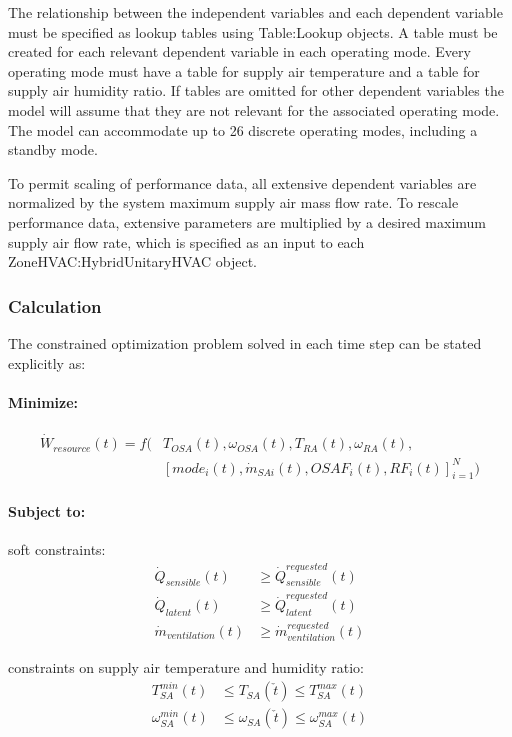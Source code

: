 The relationship between the independent variables and each dependent variable must be specified as lookup tables using Table:Lookup objects. A table must be created for each relevant dependent variable in each operating mode. Every operating mode must have a table for supply air temperature and a table for supply air humidity ratio. If tables are omitted for other dependent variables the model will assume that they are not relevant for the associated operating mode. The model can accommodate up to 26 discrete operating modes, including a standby mode.

To permit scaling of performance data, all extensive dependent variables are normalized by the system maximum supply air mass flow rate.  To rescale performance data, extensive parameters are multiplied by a desired maximum supply air flow rate, which is specified as an input to each ZoneHVAC:HybridUnitaryHVAC object.

\subsubsection{Calculation}

The constrained optimization problem solved in each time step can be stated explicitly as:

\paragraph{Minimize:}
\begin{align}
 \dot{W}_{resource}(t) = f( & T_{OSA}(t), \omega_{OSA}(t), T_{RA}(t), \omega_{RA}(t), \nonumber \\
                            & [ mode_{i}(t), \dot{m}_{SAi}(t), OSAF_{i}(t), RF_{i}(t) ]_{i=1}^{N} )
\end{align}

\paragraph{Subject to:}

soft constraints:
\begin{align}
	\dot{Q}_{sensible}(t) & \geq \dot{Q}_{sensible}^{requested}(t) \\
	\dot{Q}_{latent}(t)   & \geq \dot{Q}_{latent}^{requested}(t) \\
	\dot{m}_{ventilation}(t) & \geq \dot{m}_{ventilation}^{requested}(t)
\end{align}

constraints on supply air temperature and humidity ratio:
\begin{align}
	T_{SA}^{min}(t)      & \leq T_{SA}(\check{t})      \leq T_{SA}^{max}(t) \\
	\omega_{SA}^{min}(t) & \leq \omega_{SA}(\check{t}) \leq \omega_{SA}^{max}(t)
\end{align}


